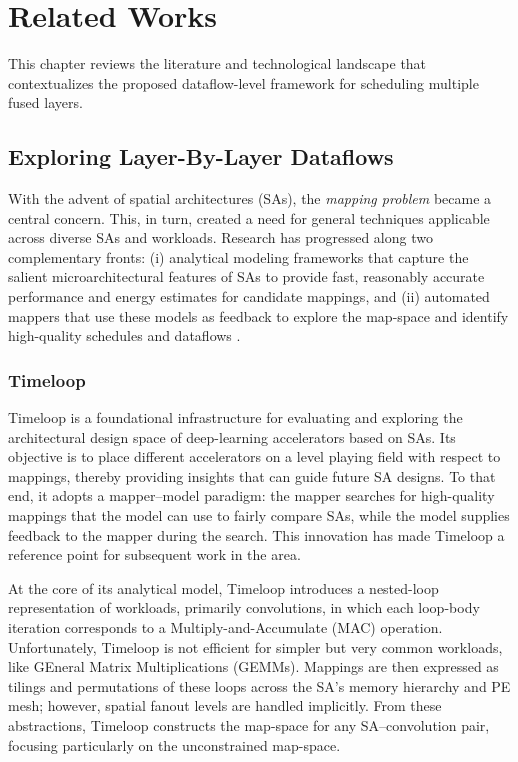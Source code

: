 \chapter{Related Works}
\label{ch:Related Works}
This chapter reviews the literature and technological landscape that contextualizes the proposed dataflow-level framework for scheduling multiple fused layers. 


\section{Exploring Layer-By-Layer Dataflows}

With the advent of spatial architectures (SAs), the \emph{mapping problem} became a central concern. This, in turn, created a need for general techniques applicable across diverse SAs and workloads. Research has progressed along two complementary fronts: (i) analytical modeling frameworks that capture the salient microarchitectural features of SAs to provide fast, reasonably accurate performance and energy estimates for candidate mappings, and (ii) automated mappers that use these models as feedback to explore the map-space and identify high-quality schedules and dataflows \cite{parashar2019timeloop, Factorflow}. 

\subsection{Timeloop}

Timeloop \cite{parashar2019timeloop} is a foundational infrastructure for evaluating and exploring the architectural design space of deep-learning accelerators based on SAs. Its objective is to place different accelerators on a level playing field with respect to mappings, thereby providing insights that can guide future SA designs. To that end, it adopts a mapper–model paradigm: the mapper searches for high-quality mappings that the model can use to fairly compare SAs, while the model supplies feedback to the mapper during the search. This innovation has made Timeloop a reference point for subsequent work in the area.

At the core of its analytical model, Timeloop introduces a nested-loop representation of workloads, primarily convolutions, in which each loop-body iteration corresponds to a Multiply-and-Accumulate (MAC) operation. 
Unfortunately, Timeloop is not efficient for simpler but very common workloads, like GEneral Matrix Multiplications (GEMMs).
Mappings are then expressed as tilings and permutations of these loops across the SA’s memory hierarchy and PE mesh; however, spatial fanout levels are handled implicitly. From these abstractions, Timeloop constructs the map-space for any SA–convolution pair, focusing particularly on the unconstrained map-space. 

